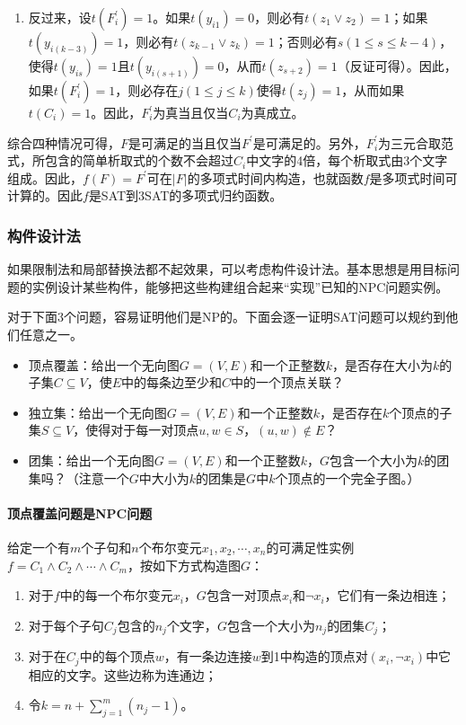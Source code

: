 \documentclass[./../main.tex]{subfiles}
\begin{document}
\begin{enumerate}
    其实证明到这里就足够了，但是为了加强问题，我们进一步证明等价性。

    \item 反过来，设$t(F_{i}^{\prime})=1$。如果$t(y_{i1})=0$，则必有$t(z_{1}\vee z_{2})=1$；如果$t(y_{i(k-3)})=1$，则必有$t(z_{k-1}\vee z_{k})=1$；否则必有$s(1\leq s\leq k-4)$，使得$t(y_{is})=1$且$t(y_{i(s+1)})=0$，从而$t(z_{s+2})=1$（反证可得）。因此，如果$t(F_{i}^{\prime})=1$，则必存在$j(1\leq j\leq k)$使得$t(z_{j})=1$，从而如果$t(C_{i})=1$。因此，$F_{i}^{\prime}$为真当且仅当$C_{i}$为真成立。
\end{enumerate}

综合四种情况可得，$F$是可满足的当且仅当$F^{\prime}$是可满足的。另外，$F_{i}^{\prime}$为三元合取范式，所包含的简单析取式的个数不会超过$C_{i}$中文字的4倍，每个析取式由3个文字组成。因此，$f(F)=F^{\prime}$可在$|F|$的多项式时间内构造，也就函数$f$是多项式时间可计算的。因此$f$是SAT到3SAT的多项式归约函数。

\subsubsection{构件设计法}
如果限制法和局部替换法都不起效果，可以考虑构件设计法。基本思想是用目标问题的实例设计某些构件，能够把这些构建组合起来“实现”已知的NPC问题实例。

对于下面3个问题，容易证明他们是NP的。下面会逐一证明SAT问题可以规约到他们任意之一。
\begin{itemize}
    \item 顶点覆盖：给出一个无向图$G=(V,E)$和一个正整数$k$，是否存在大小为$k$的子集$C \subseteq V$，使$E$中的每条边至少和$C$中的一个顶点关联？
    \item 独立集：给出一个无向图$G=(V,E)$和一个正整数$k$，是否存在$k$个顶点的子集$S \subseteq V$，使得对于每一对顶点$u,w \in S$，$(u,w) \notin E$？
    \item 团集：给出一个无向图$G=(V,E)$和一个正整数$k$，$G$包含一个大小为$k$的团集吗？（注意一个$G$中大小为$k$的团集是$G$中$k$个顶点的一个完全子图。）
\end{itemize}

\paragraph{顶点覆盖问题是NPC问题}

给定一个有$m$个子句和$n$个布尔变元$x_{1},x_{2},\cdots,x_{n}$的可满足性实例$f=C_{1}\wedge C_{2}\wedge\cdots\wedge C_{m}$，按如下方式构造图$G$：

\begin{enumerate}
    \item 对于$f$中的每一个布尔变元$x_{i}$，$G$包含一对顶点$x_{i}$和$\neg x_{i}$，它们有一条边相连；
    \item 对于每个子句$C_{j}$包含的$n_{j}$个文字，$G$包含一个大小为$n_{j}$的团集$C_{j}$；
    \item 对于在$C_{j}$中的每个顶点$w$，有一条边连接$w$到1中构造的顶点对$(x_{i},\neg x_{i})$中它相应的文字。这些边称为连通边；
    \item 令$k=n+\sum_{j=1}^{m}(n_{j}-1)$。
\end{enumerate}
\end{document}
